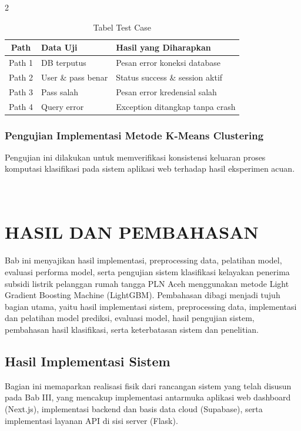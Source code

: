 \documentclass[12pt, a4paper, onecolumn, oneside]{report}
\begin{document}
\begin{spacing}{2}
\begin{table}[H]
\centering
\caption{Tabel Test Case}
\label{tab:test_case_whitebox_s1}
\begin{tabularx}{\textwidth}{|c|p{4cm}|X|}
\hline
\textbf{Path} & \textbf{Data Uji} & \textbf{Hasil yang Diharapkan} \\ \hline
Path 1 & DB terputus & Pesan error koneksi database \\ \hline
Path 2 & User \& pass benar & Status success \& session aktif \\ \hline
Path 3 & Pass salah & Pesan error kredensial salah \\ \hline
Path 4 & Query error & Exception ditangkap tanpa crash \\ \hline
\end{tabularx}
\end{table}

\subsection{Pengujian Implementasi Metode K-Means Clustering}
Pengujian ini dilakukan untuk memverifikasi konsistensi keluaran proses komputasi klasifikasi pada sistem aplikasi web terhadap hasil eksperimen acuan.


\chapter[HASIL DAN PEMBAHASAN]{\\ HASIL DAN PEMBAHASAN}

Bab ini menyajikan hasil implementasi, preprocessing data, pelatihan model, evaluasi performa model, serta pengujian sistem klasifikasi kelayakan penerima subsidi listrik pelanggan rumah tangga PLN Aceh menggunakan metode Light Gradient Boosting Machine (LightGBM). Pembahasan dibagi menjadi tujuh bagian utama, yaitu hasil implementasi sistem, preprocessing data, implementasi dan pelatihan model prediksi, evaluasi model, hasil pengujian sistem, pembahasan hasil klasifikasi, serta keterbatasan sistem dan penelitian.

\section{Hasil Implementasi Sistem}
Bagian ini memaparkan realisasi fisik dari rancangan sistem yang telah disusun pada Bab III, yang mencakup implementasi antarmuka aplikasi web dashboard (Next.js), implementasi backend dan basis data cloud (Supabase), serta implementasi layanan API di sisi server (Flask).


\end{spacing}
\end{document}
